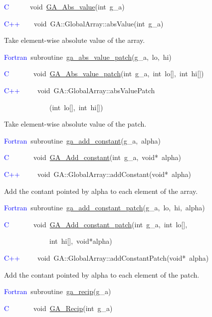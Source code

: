 \textcolor{blue}{C}~~~~~~void~\href{https://hpc.pnl.gov/globalarrays/api/c_op_api.html\#ga_abs_value}{GA\_{}Abs\_{}value}(int~g\_a)

\textcolor{blue}{C++}~~~~void~GA::GlobalArray::absValue(int~g\_a)

Take element-wise absolute value of the array. 

\textcolor{blue}{Fortran}~subroutine~\href{https://hpc.pnl.gov/globalarrays/api/f_op_api.html\#ga_abs_value_patch}{ga\_{}abs\_{}value\_{}patch}(g\_a,~lo,~hi)~

\textcolor{blue}{C}~~~~~~~void~\href{https://hpc.pnl.gov/globalarrays/api/c_op_api.html\#ga_abs_value_patch}{GA\_{}Abs\_{}value\_{}patch}(int~g\_a,~int~lo{[}{]},~int~hi{[}{]})~

\textcolor{blue}{C++}~~~~~void~GA::GlobalArray::absValuePatch

~~~~~~~~~~~~~(int~lo{[}{]},~int~hi{[}{]})

Take element-wise absolute value of the patch.

\textcolor{blue}{Fortran}~subroutine~\href{https://hpc.pnl.gov/globalarrays/api/f_op_api.html\#ga_add_constant}{ga\_{}add\_{}constant}(g\_a,~alpha)~

\textcolor{blue}{C}~~~~~~~void~\href{https://hpc.pnl.gov/globalarrays/api/c_op_api.html\#ga_add_constant}{GA\_{}Add\_{}constant}(int~g\_a,~void{*}~alpha)~

\textcolor{blue}{C++}~~~~~void~GA::GlobalArray::addConstant(void{*}~alpha)

Add the contant pointed by alpha to each element of the array. 

\textcolor{blue}{Fortran}~subroutine~\href{https://hpc.pnl.gov/globalarrays/api/f_op_api.html\#ga_add_constant_patch}{ga\_{}add\_{}constant\_{}patch}(g\_a,~lo,~hi,~alpha)~

\textcolor{blue}{C}~~~~~~~void~\href{https://hpc.pnl.gov/globalarrays/api/c_op_api.html\#ga_add_constant_patch}{GA\_{}Add\_{}constant\_{}patch}(int~g\_a,~int~lo{[}{]},~

~~~~~~~~~~~~~int~hi{[}{]},~void{*}alpha)~

\textcolor{blue}{C++}~~~~~void~GA::GlobalArray::addConstantPatch(void{*}~alpha)

Add the contant pointed by alpha to each element of the patch. 

\textcolor{blue}{Fortran~}subroutine~\href{https://hpc.pnl.gov/globalarrays/api/f_op_api.html\#ga_recip}{ga\_{}recip}(g\_a)

\textcolor{blue}{C}~~~~~~~void~\href{https://hpc.pnl.gov/globalarrays/api/c_op_api.html\#ga_recip}{GA\_{}Recip}(int~g\_a)

